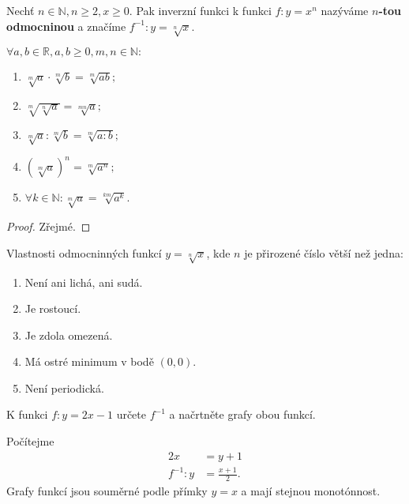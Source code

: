 \begin{definition}
    Nechť $n\in \mathbb N, n\geq 2, x \geq 0.$ Pak inverzní funkci k funkci
    $f:y=x^n$ nazýváme \textbf{$n$-tou odmocninou} a značíme $f^{-1}: y=\sqrt[n]{x}.$
\end{definition}

\begin{veta}
    $\forall a,b \in \mathbb R, a,b \geq 0, m,n \in \mathbb N:$
    \begin{enumerate}[$i.$]
        \item $\sqrt[m]{a}\cdot \sqrt[m]{b}=\sqrt[m]{ab};$
       	\item $\sqrt[m]{\sqrt[n]{a} } = \sqrt[mn]{a};$
       	\item $\sqrt[m]{a} : \sqrt[m]{b} = \sqrt[m]{a:b};$
       	\item $\left ( \sqrt[m]{a}  \right )^n = \sqrt[m]{a^n};$
       	\item $\forall k \in \mathbb N: \sqrt[m]{a}=\sqrt[km]{a^k}.$
    \end{enumerate}
\end{veta}

\begin{proof}
    Zřejmé.
\end{proof}

\begin{veta}
    Vlastnosti odmocninných funkcí $y= \sqrt[n]{x}$, kde $n$ je přirozené číslo větší
    než jedna:
    \begin{enumerate}[$i.$]
        \item Není ani lichá, ani sudá.
       	\item Je rostoucí.
        \item Je zdola omezená.
        \item Má ostré minimum v bodě $(0,0).$
        \item Není periodická.
    \end{enumerate}
\end{veta}

\begin{priklad}
K funkci $f:y=2x-1$ určete $f^{-1}$ a načrtněte grafy obou funkcí.
\end{priklad}

\begin{reseni}
Počítejme
\begin{align*}
    2x&=y+1\\
    f^{-1}:y &= \frac{x+1}{2}.
\end{align*}
Grafy funkcí jsou souměrné podle přímky $y=x$ a mají stejnou monotónnost.
\end{reseni}
